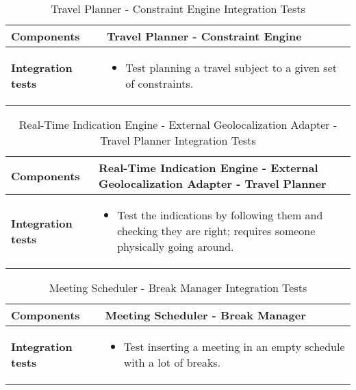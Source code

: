 \begin{table}[H]	
	\centering
	\def\arraystretch{1.5}
	\begin{tabular}{|m{4cm}|m{12cm}|}
		\hline
		\textbf{Components} & Travel Planner - Constraint Engine \\ \hline
		\textbf{Integration tests} & 
			\begin{itemize}
			\item Test planning a travel subject to a given set of constraints.
			\end{itemize} \\ \hline
	\end{tabular}
	\caption{Travel Planner - Constraint Engine Integration Tests}
\end{table}

\begin{table}[H]	
	\centering
	\def\arraystretch{1.5}
	\begin{tabular}{|m{4cm}|m{12cm}|}
		\hline
		\textbf{Components} & Real-Time Indication Engine - External Geolocalization Adapter - Travel Planner \\ \hline
		\textbf{Integration tests} & 
			\begin{itemize}
			\item Test the indications by following them and checking they are right; requires someone physically going around.
			\end{itemize}   \\ \hline
	\end{tabular}
	\caption{Real-Time Indication Engine - External Geolocalization Adapter - Travel Planner Integration Tests}
\end{table}

\begin{table}[H]	
	\centering
	\def\arraystretch{1.5}
	\begin{tabular}{|m{4cm}|m{12cm}|}
		\hline
		\textbf{Components} & Meeting Scheduler - Break Manager \\ \hline
		\textbf{Integration tests} & 
			\begin{itemize}
			\item Test inserting a meeting in an empty schedule with a lot of breaks.
			\end{itemize} \\ \hline
	\end{tabular}
	\caption{Meeting Scheduler - Break Manager Integration Tests}
\end{table}

